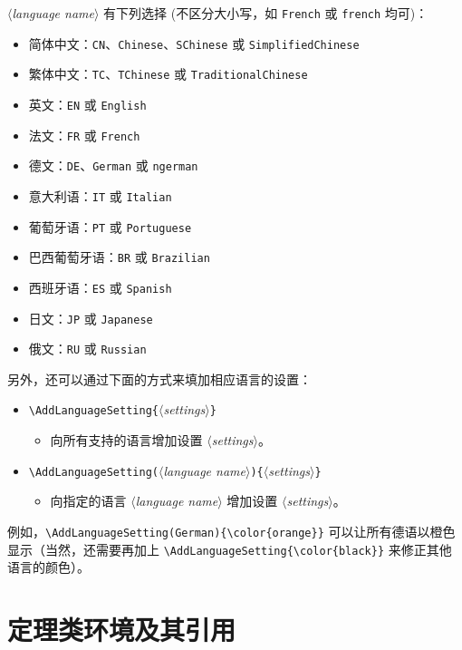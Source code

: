 \documentclass{simplivre}
\providecommand{\meta}[1]{$\langle${\normalfont\itshape#1}$\rangle$}
\begin{document}
\meta{language name} 有下列选择 (不区分大小写，如 \texttt{French} 或 \texttt{french} 均可)：
\begin{itemize}
    \item 简体中文：\texttt{CN}、\texttt{Chinese}、\texttt{SChinese} 或 \texttt{SimplifiedChinese}
    \item 繁体中文：\texttt{TC}、\texttt{TChinese} 或 \texttt{TraditionalChinese}
    \item 英文：\texttt{EN} 或 \texttt{English}
    \item 法文：\texttt{FR} 或 \texttt{French}
    \item 德文：\texttt{DE}、\texttt{German} 或 \texttt{ngerman}
    \item 意大利语：\texttt{IT} 或 \texttt{Italian}
    \item 葡萄牙语：\texttt{PT} 或 \texttt{Portuguese}
    \item 巴西葡萄牙语：\texttt{BR} 或 \texttt{Brazilian}
    \item 西班牙语：\texttt{ES} 或 \texttt{Spanish}
    \item 日文：\texttt{JP} 或 \texttt{Japanese}
    \item 俄文：\texttt{RU} 或 \texttt{Russian}
\end{itemize}

另外，还可以通过下面的方式来填加相应语言的设置：
\begin{itemize}
    \item \lstinline|\AddLanguageSetting{|\meta{settings}\lstinline|}|
    \begin{itemize}
        \item 向所有支持的语言增加设置 \meta{settings}。
    \end{itemize}
    \item \lstinline|\AddLanguageSetting(|\meta{language name}\lstinline|){|\meta{settings}\lstinline|}|
    \begin{itemize}
        \item 向指定的语言 \meta{language name} 增加设置 \meta{settings}。
    \end{itemize}
\end{itemize}
例如，\lstinline|\AddLanguageSetting(German){\color{orange}}| 可以让所有德语以橙色显示（当然，还需要再加上 \lstinline|\AddLanguageSetting{\color{black}}| 来修正其他语言的颜色）。


\section{定理类环境及其引用}
\end{document}
